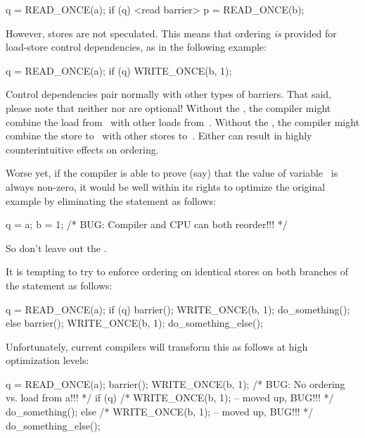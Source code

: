 \begin{VerbatimU}
	q = READ_ONCE(a);
	if (q) {
		<read barrier>
		p = READ_ONCE(b);
	}
\end{VerbatimU}

However, stores are not speculated.
This means that ordering \emph{is} provided for load-store control
dependencies, as in the following example:

\begin{VerbatimU}
	q = READ_ONCE(a);
	if (q) {
		WRITE_ONCE(b, 1);
	}
\end{VerbatimU}

Control dependencies pair normally with other types of barriers.
That said, please note that neither  nor 
are optional!
Without the , the compiler might combine the
load from~ with other loads from~.  Without the ,
the compiler might combine the store to~ with other stores to~.
Either can result in highly counterintuitive effects on ordering.

Worse yet, if the compiler is able to prove (say) that the value of
variable~ is always non-zero, it would be well within its rights
to optimize the original example by eliminating the  statement
as follows:

\begin{VerbatimU}
	q = a;
	b = 1;  /* BUG: Compiler and CPU can both reorder!!! */
\end{VerbatimU}

So don't leave out the .

It is tempting to try to enforce ordering on identical stores on both
branches of the  statement as follows:

\begin{VerbatimU}
	q = READ_ONCE(a);
	if (q) {
		barrier();
		WRITE_ONCE(b, 1);
		do_something();
	} else {
		barrier();
		WRITE_ONCE(b, 1);
		do_something_else();
	}
\end{VerbatimU}

Unfortunately, current compilers will transform this as follows at high
optimization levels:

\begin{VerbatimU}
	q = READ_ONCE(a);
	barrier();
	WRITE_ONCE(b, 1);  /* BUG: No ordering vs. load from a!!! */
	if (q) {
		/* WRITE_ONCE(b, 1); -- moved up, BUG!!! */
		do_something();
	} else {
		/* WRITE_ONCE(b, 1); -- moved up, BUG!!! */
		do_something_else();
	}
\end{VerbatimU}

